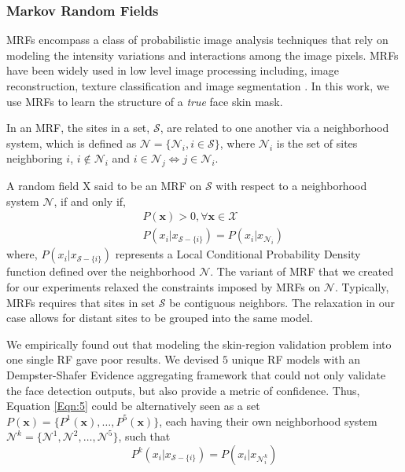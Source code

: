 \documentclass[times, 10pt,twocolumn]{article}
\begin{document}
\subsubsection{Markov Random Fields}\label{MRF} MRFs encompass a
class of probabilistic image analysis techniques that rely on
modeling the intensity variations and interactions among the image
pixels. MRFs have been widely used in low level image processing
including, image reconstruction, texture classification and image
segmentation \cite{perez_markov_1998}. In this work, we use MRFs to
learn the structure of a {\it true} face skin mask.

In an MRF, the sites in a set, $\mathcal S$, are related to one
another via a neighborhood system, which is defined as ${\mathcal
N}=\{{\mathcal N}_i, i \in \mathcal S\}$, where ${\mathcal N}_i$ is
the set of sites neighboring $i$, $i \notin {\mathcal N}_i$ and $i
\in {\mathcal N}_j \Longleftrightarrow j \in {\mathcal N}_i$.

A random field X said to be an MRF on $\mathcal S$ with respect to a
neighborhood system $\mathcal N$, if and only if,
\begin{eqnarray}&& P({\mathbf x})>0, \forall \mathbf x \in \mathcal X  \\ && P(x_i\vert x_{{\mathcal S}-\{i\}})=P(x_i\vert x_{{\mathcal N}_i}) \label{Eqn:5} \end{eqnarray}
where, $P(x_i\vert x_{{\mathcal S}-\{i\}})$ represents a Local
Conditional Probability Density function defined over the
neighborhood $\mathcal N$. The variant of MRF that we created for
our experiments relaxed the constraints imposed by MRFs on $\mathcal
N$. Typically, MRFs requires that sites in set $\mathcal S$ be
contiguous neighbors. The relaxation in our case allows for distant
sites to be grouped into the same model.

We empirically found out that modeling the skin-region validation
problem into one single RF gave poor results. We devised $5$ unique
RF models with an Dempster-Shafer Evidence aggregating framework
that could not only validate the face detection outputs, but also
provide a metric of confidence. Thus, Equation \ref{Eqn:5} could be
alternatively seen as a set $P({\mathbf x}) = \{P^1({\mathbf x}),
\ldots, P^5({\mathbf x})\}$, each having their own neighborhood
system $\mathcal N^k = \{\mathcal N^1, \mathcal N^2, \ldots,
\mathcal N^5\}$, such that
\begin{equation}
P^k(x_i\vert x_{{\mathcal S}-\{i\}})=P(x_i\vert x_{{\mathcal
N^k_i}})
\end{equation}
\end{document}
